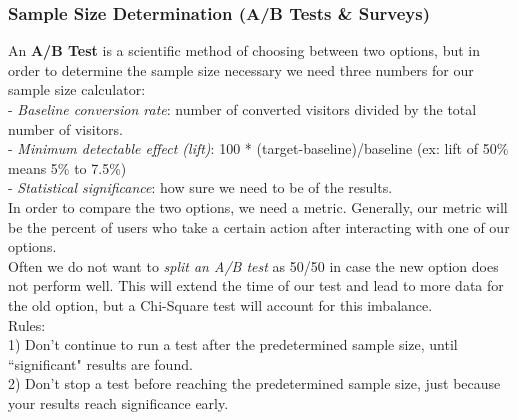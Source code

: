 \documentclass[11pt, a4paper]{article}
\begin{document}
\begin{spacing}{1.1}
	\subsubsection{Sample Size Determination (A/B Tests \& Surveys)}
	An \textbf{A/B Test} is a scientific method of choosing between two options, but in order to determine the sample size necessary we need three numbers for our sample size calculator: \\
	\hspace*{3mm} - \textit{Baseline conversion rate}: number of converted visitors divided by the total number of visitors. \\
	\hspace*{3mm} - \textit{Minimum detectable effect (lift)}: 100 * (target-baseline)/baseline (ex: lift of 50\% means 5\% to 7.5\%)\\
	\hspace*{3mm} - \textit{Statistical significance}: how sure we need to be of the results. \\
	In order to compare the two options, we need a metric. Generally, our metric will be the percent of users who take a certain action after interacting with one of our options. \vspace*{1mm} \\
	Often we do not want to \textit{split an A/B test} as 50/50 in case the new option does not perform well. This will extend the time of our test and lead to more data for the old option, but a Chi-Square test will account for this imbalance. \vspace*{1mm} \\
	Rules: \\
	1) Don’t continue to run a test after the predetermined sample size, until ``significant" results are found. \\
	2) Don’t stop a test before reaching the predetermined sample size, just because your results reach \hspace*{4mm} significance early. \newpage


\end{spacing}
\end{document}
